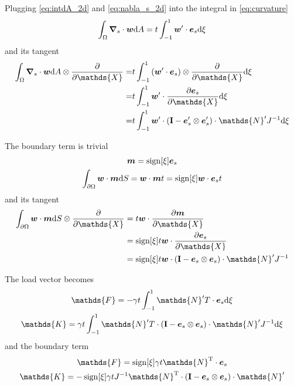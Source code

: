 \documentclass[a4paper,11pt]{article}
\renewcommand{\to}[1]{\text{\boldmath $#1$}} %
\newcommand{\ts}[1]{\text{\boldmath $\mathrm{#1}$}} %
\newcommand{\uv}[1]{\mathds{#1}}
\newcommand{\um}[1]{\mathds{#1}}
\newcommand{\intd}[1]{\mathrm{d}#1}
\newcommand{\pderiv}[2]{\frac{\partial#1}{\partial#2}}
\newcommand{\T}{\mathrm{T}}
\DeclareMathOperator{\sign}{sign}
\begin{document}
Plugging \eqref{eq:intdA_2d} and \eqref{eq:nabla_s_2d} into the integral in \eqref{eq:curvature}
\begin{align}
 \int_\Omega\to \nabla_s\cdot\to w\intd A &= t \int_{-1}^{1} \to w'\cdot \to e_s \intd\xi\\
\end{align}
and its tangent
\begin{align}
 \int_\Omega\to \nabla_s\cdot\to w\intd A \otimes \pderiv{}{\uv X}
 =&t \int_{-1}^{1} \left(\to w'\cdot \to e_s\right)\otimes \pderiv{}{\uv X}  \intd\xi\\
 =&t \int_{-1}^{1} \to w'\cdot \pderiv{\to e_s}{\uv X} \intd\xi\\
 =&t \int_{-1}^{1} \to w'\cdot \left(\ts I-\to e_s'\otimes\to e_s' \right)\cdot \um N' J^{-1} \intd\xi
\end{align}

The boundary term is trivial
\begin{gather}
 \to m = \sign[\xi]\to e_s\\
 \int_{\partial\Omega} \to w\cdot \to m\intd S = \to w \cdot\to m t = \sign[\xi]\to w \cdot \to e_s t
\end{gather}
and its tangent
\begin{align}
 \int_{\partial\Omega} \to w\cdot \to m\intd S\otimes \pderiv{}{\uv X} &= t \to w\cdot\pderiv{\to m}{\uv X}\\
 &= \sign[\xi]t \to w\cdot\pderiv{\to e_s}{\uv X}\\
 &= \sign[\xi]t \to w\cdot \left(\ts I-\to e_s\otimes\to e_s\right)\cdot \um N' J^{-1}
\end{align}

The load vector becomes
\begin{gather}
 \uv F = -\gamma t \int_{-1}^{1} {\um N}'^\T\cdot \to e_s \intd\xi\\
 \um K = \gamma t \int_{-1}^{1} {\um N}'^\T\cdot \left(\ts I-\to e_s\otimes\to e_s\right)\cdot{\um N}' J^{-1} \intd\xi
\end{gather}
and the boundary term
\begin{gather}
 \uv F = \sign[\xi]\gamma t {\um N}^\T\cdot\to e_s\\
 \um K = -\sign[\xi]\gamma t J^{-1} {\um N}^\T \cdot (\ts I - \to e_s\otimes \to e_s)\cdot {\um N}'
\end{gather}
\end{document}
